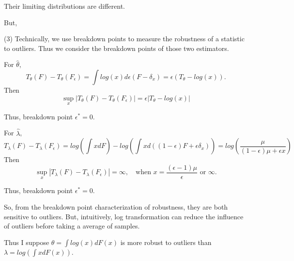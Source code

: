 \begin{solution}
    Their limiting distributions are different.

    But, 

    (3) Technically, we use breakdown points to measure the robustness of a statistic to outliers. Thus we consider the breakdown points of those two estimators.
    
    For $\hat{\theta}$, 
    \begin{equation*}
        T_\theta(F) - T_\theta(F_\epsilon) = \int log(x) d \epsilon (F -\delta_x)
        = \epsilon (T_\theta - log(x)).
    \end{equation*}
    Then
    \begin{equation*}
        \sup_x | T_\theta(F) - T_\theta(F_\epsilon) | = \epsilon |T_\theta - log(x)|
    \end{equation*}

    Thus, breakdown point $\epsilon^* = 0$.

    For $\hat{\lambda}$, 
    \begin{equation*}
        T_\lambda(F) - T_\lambda(F_\epsilon) = log \left( \int x d F \right) - log \left( \int x d( (1-\epsilon)F + \epsilon \delta_x)\right)
        = log\left(\frac{\mu}{(1-\epsilon)\mu + \epsilon x}\right)
    \end{equation*}
    Then
    \begin{equation*}
        \sup_x | T_\lambda(F) - T_\lambda(F_\epsilon) | 
        =  \infty,
        \quad \text{when } x = \frac{(\epsilon - 1)\mu}{\epsilon} \text{ or } \infty.
    \end{equation*}

    Thus, breakdown point $\epsilon^* = 0$.

    So, from the breakdown point characterization of robustness, they are both sensitive to outliers. 
    But, intuitively, log transformation can reduce the influence of outliers before taking a average of samples. 
    
    Thus I suppose $\theta= \int log(x) d F(x)$ is more robust to outliers than $\lambda = log \left( \int  x d F(x) \right)$.

\end{solution}
